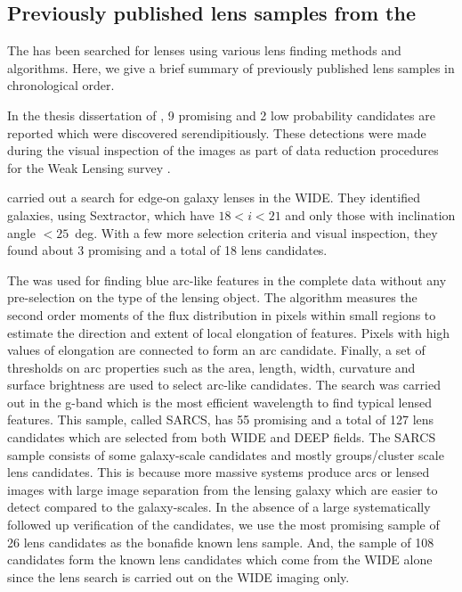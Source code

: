\documentclass[useAMS,usenatbib,a4paper]{mn2e}
\begin{document}
\subsection{Previously published lens samples from the \cfhtls}
\label{sec:data:kls}

The \cfhtls has been searched for lenses using various lens finding
methods and algorithms. Here, we give a brief summary of previously published lens
samples in chronological order.

In the thesis dissertation of \citet{Thanjavur2009}, 9 promising and 2
low probability candidates are reported which were discovered
serendipitiously. These detections were made during the visual
inspection of the \cfhtls images as part of data reduction procedures
for the Weak Lensing survey \citep{Benjamin2007}.

\citet{Sygnet2010} carried out a search for edge-on galaxy lenses in the
\cfhtls WIDE. They identified galaxies, using {\sc Sextractor}, which
have $18<i<21$ and only those with inclination angle $<25$~deg. With a
few more selection criteria and visual inspection, they found about 3
promising and a total of 18 lens candidates.

The \af \citep{More2012} was used for finding blue arc-like features in
the complete \cfhtls data without any pre-selection on the type of the lensing
object. The algorithm measures the second order moments of the flux distribution
in pixels within small regions to estimate the direction and extent of local
elongation of features. Pixels with high values of elongation are connected to
form an arc candidate. Finally, a set of thresholds on arc properties such as
the area, length, width, curvature and surface brightness are used to select
arc-like candidates. The search was carried out in the g-band which is the most
efficient wavelength to find typical lensed features.  This sample, called
SARCS, has 55 promising and a total of 127 lens candidates which are selected
from both \cfhtls WIDE and DEEP fields. The SARCS sample consists of some
galaxy-scale candidates and mostly groups/cluster scale lens candidates. This is
because more massive systems produce arcs or lensed images with large image
separation from the lensing galaxy which are easier to detect compared to the
galaxy-scales.  In the absence of a large systematically followed up
verification of the candidates, we use the  most promising sample of 26 lens
candidates as the bonafide known lens sample. And, the sample of 108 candidates
form the known lens candidates which come from the \cfhtls WIDE alone since the
\sw lens search is carried out on the WIDE imaging only.
\end{document}
